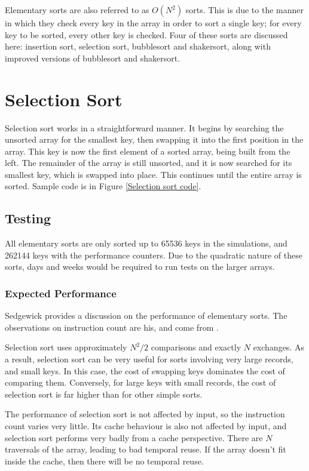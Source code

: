 \label{ordernsquared}
Elementary sorts are also referred to as $O(N^2)$ sorts. This is due to the
manner in which they check every key in the array in order to sort a single key;
for every key to be sorted, every other key is checked.  Four of these sorts are
discussed here: insertion sort, selection sort, bubblesort and shakersort,
along with improved versions of bubblesort and shakersort.

\section{Selection Sort}

Selection sort works in a straightforward manner. It begins by 
searching the unsorted array for the smallest key, then swapping it into the
first position in the array. This key is now the first element of a sorted
array, being built from the left. The remainder of the array is
still unsorted, and it is now searched for its smallest key, which is swapped
into place. This continues until the entire array is sorted. Sample code is in
Figure \vref{Selection sort code}.

\subsection{Testing}
All elementary sorts are only sorted up to 65536 keys in the simulations, and
262144 keys with the performance counters. Due to the quadratic nature of
these sorts, days and weeks would be required to run tests on the larger arrays.

\subsubsection{Expected Performance}
Sedgewick provides a discussion on the performance of elementary sorts. The
observations on instruction count are his, and come from \cite{Sedgewick02}.

Selection sort uses approximately $N^2/2$ comparisons and exactly $N$ exchanges.
As a result, selection sort can be very useful for sorts involving very large
records, and small keys. In this case, the cost of swapping keys dominates the
cost of comparing them. Conversely, for large keys with small records, the cost
of selection sort is far higher than for other simple sorts.

The performance of selection sort is not affected by input, so the instruction
count varies very little.  Its cache behaviour is also not affected by input,
and selection sort performs very badly from a cache perspective. There are $N$
traversals of the array, leading to bad temporal reuse. If the array doesn't fit
inside the cache, then there will be no temporal reuse.

